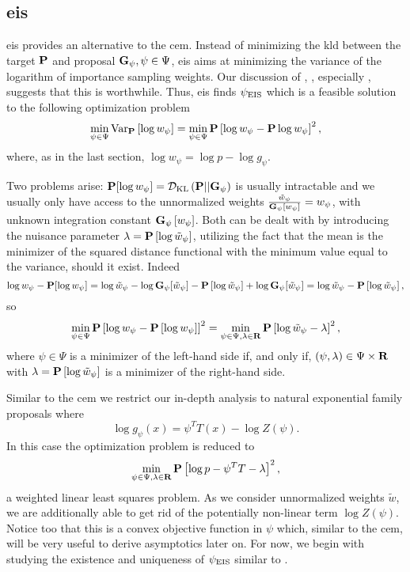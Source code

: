 \subsection{\texorpdfstring{\Acrfull{eis}}{Efficient importance sampling}}
\label{subsec:eis}
\gls{eis} \citep{Richard2007Efficient} provides an alternative to the \gls{cem}. Instead of minimizing the \gls{kld} between the target $\P$ and proposal $\G_{\psi}, \psi \in \Psi$, \gls{eis} aims at minimizing the variance of the logarithm of importance sampling weights. 
Our discussion of \citep{Chatterjee2018Sample}, , especially , suggests that this is worthwhile. 
Thus, \acrshort{eis} finds $\peis$ which is a feasible solution to the following optimization problem
\begin{align}
    \label{eq:eis_optim}
\min_{\psi \in \Psi} \text{Var}_{\P} \left[ \log w_{\psi} \right] = \min_{\psi \in \Psi} \P \left[ \log w_{\psi} - \P \log w_{\psi} \right]^{2},
\end{align}
where, as in the last section, $\log w_{\psi} = \log p - \log g_{\psi}$.

Two problems arise: $\P [\log w_{\psi}] = \Dkl{\P}{\G_{\psi}}$ is usually intractable and we usually only have access to the unnormalized weights $\frac{\tilde w_{\psi}}{\G_{\psi} \left[ w_{\psi} \right]} = w_{\psi}$, with unknown integration constant $\G_{\psi} \left[ w_{\psi} \right]$. Both can be dealt with by introducing the nuisance parameter $\lambda = \P \left[ \log \tilde w_{\psi} \right]$, utilizing the fact that the mean is the minimizer of the squared distance functional with the minimum value equal to the variance, should it exist. Indeed 
$$
    \log w_{\psi} - \P [\log w_{\psi}] = \log \tilde w_{\psi} - \log \G_{\psi} [\tilde w_{\psi}] - \P \left[ \log \tilde w_{\psi} \right] + \log \G_{\psi}[\tilde w_{\psi}] = \log \tilde w_{\psi} - \P \left[ \log \tilde w_{\psi} \right],
$$
so
$$
    \min_{\psi \in \Psi} \P \left[ \log w_{\psi} - \P \left[ \log w_{\psi} \right] \right]^{2} = \min_{\psi \in \Psi, \lambda \in \R} \P \left[ \log \tilde w_{\psi} - \lambda \right]^{2},
$$
where $\psi\in \Psi$ is a minimizer of the left-hand side if, and only if, $(\psi, \lambda) \in \Psi \times \R$ with $\lambda = \P \left[ \log \tilde w_{\psi} \right]$ is a minimizer of the right-hand side. 

Similar to the \gls{cem} we restrict our in-depth analysis to natural exponential family proposals where $$\log g_{\psi}(x) = \psi^{T}T(x) - \log Z(\psi).$$ In this case the optimization problem is reduced to
\begin{align}
    \label{eq:eis_exponential_families}
    \min_{\psi \in \Psi, \lambda \in \R} \P \left[ \log p - \psi^{T}T - \lambda \right]^{2},
\end{align}
a weighted linear least squares problem. As we consider unnormalized weights $\tilde w$, we are additionally able to get rid of the potentially non-linear term $\log Z(\psi)$.
Notice too that this is a convex objective function in $\psi$ which, similar to the \acrshort{cem}, will be very useful to derive asymptotics later on. For now, we begin with studying the existence and uniqueness of $\peis$ similar to .

